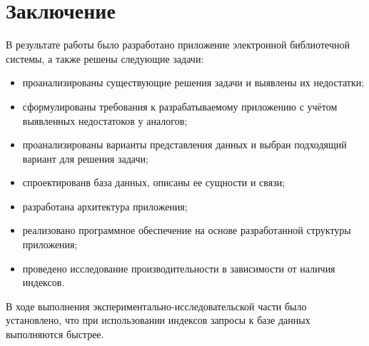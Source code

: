 \chapter*{Заключение}
В результате работы было разработано приложение электронной библиотечной системы, а также решены следующие задачи:
\begin{itemize}
    \item проанализированы существующие решения задачи и выявлены их недостатки;
    \item сформулированы требования к разрабатываемому приложению с учётом выявленных недостатоков у аналогов;
    \item проанализированы варианты представления данных и выбран подходящий вариант для решения задачи;
    \item спроектированв база данных, описаны ее сущности и связи;
    \item разработана архитектура приложения;
    \item реализовано программное обеспечение на основе разработанной структуры приложения;
    \item проведено исследование производительности в зависимости от наличия индексов.
\end{itemize}

В ходе выполнения экспериментально-исследовательской части было установлено, что при использовании индексов запросы к базе данных выполняются быстрее.